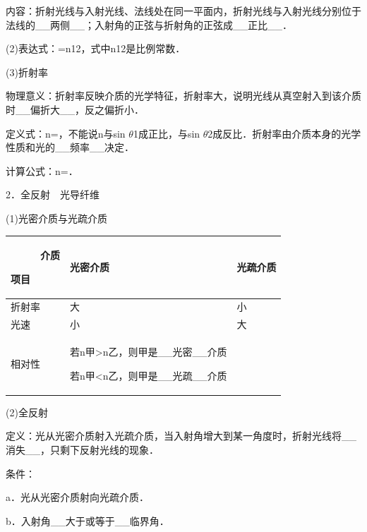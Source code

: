 内容：折射光线与入射光线、法线处在同一平面内，折射光线与入射光线分别位于法线的\_\_两侧\_\_；入射角的正弦与折射角的正弦成\_\_正比\_\_．

(2)表达式：=n12，式中n12是比例常数．

(3)折射率

物理意义：折射率反映介质的光学特征，折射率大，说明光线从真空射入到该介质时\_\_偏折大\_\_，反之偏折小．

定义式：n=，不能说n与sin $\theta$1成正比，与sin
$\theta$2成反比．折射率由介质本身的光学性质和光的\_\_频率\_\_决定．

计算公式：n=．

2．全反射　光导纤维

(1)光密介质与光疏介质

\begin{longtable}[]{@{}lll@{}}
\toprule
\begin{minipage}[b]{0.30\columnwidth}\raggedright
　　　介质

项目　　　\strut
\end{minipage} & \begin{minipage}[b]{0.30\columnwidth}\raggedright
光密介质\strut
\end{minipage} & \begin{minipage}[b]{0.30\columnwidth}\raggedright
光疏介质\strut
\end{minipage}\tabularnewline
\midrule
\endhead
折射率 & 大 & 小\tabularnewline
光速 & 小 & 大\tabularnewline
\begin{minipage}[t]{0.30\columnwidth}\raggedright
相对性\strut
\end{minipage} & \begin{minipage}[t]{0.30\columnwidth}\raggedright
若n甲\textgreater n乙，则甲是\_\_光密\_\_介质

若n甲\textless n乙，则甲是\_\_光疏\_\_介质\strut
\end{minipage} & \begin{minipage}[t]{0.30\columnwidth}\raggedright
\strut
\end{minipage}\tabularnewline
\bottomrule
\end{longtable}

(2)全反射

定义：光从光密介质射入光疏介质，当入射角增大到某一角度时，折射光线将\_\_消失\_\_，只剩下反射光线的现象．

条件：

a．光从光密介质射向光疏介质．

b．入射角\_\_大于或等于\_\_临界角．

